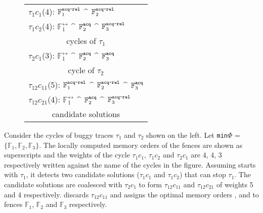 \begin{wrapfigure}{l}{0.45\textwidth}
	\vspace{-2.5em}
	\centering
	\setlength{\tabcolsep}{5pt}
	\begin{tabular}{|l|}
		\hline
		$\tau_1c_1$(4): $\mathbb{F}^\texttt{acq-rel}_1$ $\^$ $\mathbb{F}^\texttt{acq-rel}_2$ \\
		$\tau_1c_2$(4): $\mathbb{F}^\rel_1$ $\^$ $\mathbb{F}^\texttt{acq}_2$ $\^$ $\mathbb{F}^\texttt{acq-rel}_3$ \\
		\multicolumn{1}{|c|}{cycles of $\tau_1$} \\
		\hline
		
		$\tau_2c_1$(3): $\mathbb{F}^\rel_1$ $\^$ $\mathbb{F}^\texttt{acq}_2$ $\^$ $\mathbb{F}^\texttt{acq}_3$ \\
		\multicolumn{1}{|c|}{cycle of $\tau_2$} \\
		\hline
		
		$\tau_{12}c_{11}$(5): $\mathbb{F}^\texttt{acq-rel}_1$ $\^$ $\mathbb{F}^\texttt{acq-rel}_2$ $\^$ $\mathbb{F}^\texttt{acq}_3$ \\
		$\tau_{12}c_{21}$(4): $\mathbb{F}^\rel_1$ $\^$ $\mathbb{F}^\texttt{acq}_2$ $\^$ $\mathbb{F}^\texttt{acq-rel}_3$ \\
		\multicolumn{1}{|c|}{candidate solutions} \\
		\hline
	\end{tabular}
	\vspace{-2.5em}
\end{wrapfigure}

Consider the cycles of buggy traces $\tau_1$ and $\tau_2$
shown on the left.
Let {\tt min$\Phi$} = $\{\mathbb{F}_1, \mathbb{F}_2, 
\mathbb{F}_3\}$.
The locally computed memory orders of the fences are shown 
as superscripts and the weights of the cycle $\tau_1c_1$,
$\tau_1c_2$ and $\tau_2c_1$ are 4, 4, 3 respectively 
written against the name of the cycles in the figure.
%
Assuming \ourtechnique starts with $\tau_1$, it detects 
two candidate solutions ($\tau_1c_1$ and $\tau_1c_2$) that 
can stop $\tau_1$. 
%
The candidate solutions are coalesced with $\tau_2c_1$
to form $\tau_{12}c_{11}$ and $\tau_{12}c_{21}$ of
weights 5 and 4 respectively. \ourtechnique discards
$\tau_{12}c_{11}$ and assigns the optimal memory orders
\rel, \acq and \acqrel to fences $\mathbb{F}_1$,
$\mathbb{F}_2$ and $\mathbb{F}_3$ respectively.

